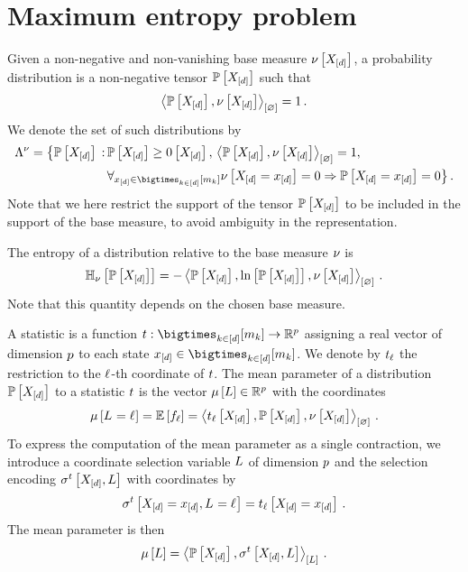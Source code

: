 \section{Maximum entropy problem}

Given a non-negative and non-vanishing base measure $\nu\left[X_{[d]}\right]$, a probability distribution is a non-negative tensor $\mathbb{P}\left[X_{[d]}\right]$ such that
\begin{align*}
    \left\langle \mathbb{P}\left[X_{[d]}\right],\nu\left[X_{[d]}\right]\right\rangle_{\left[ \varnothing \right]} = 1 \, .
\end{align*}
We denote the set of such distributions by
\begin{align*}
    \distmeasuredby{\basemeasure}
    = \big\{ \probwith \wcols &\probwith \geq \zerosat{\shortcatvariables} \ncond \contraction{\probwith,\basemeasurewith} = 1 \ncond \\
    &\forall_{\shortcatindicesin} \basemeasureat{\indexedshortcatvariables}=0 \Rightarrow \probat{\indexedshortcatvariables}=0  \big\} \, .
\end{align*}
Note that we here restrict the support of the tensor $\mathbb{P}\left[X_{[d]}\right]$ to be included in the support of the base measure, to avoid ambiguity in the representation.

The entropy of a distribution relative to the base measure $\nu$ is
\begin{align*}
    \mathbb{H}_{\nu}\left[\mathbb{P}\left[X_{[d]}\right]\right]
    = -\left\langle \mathbb{P}\left[X_{[d]}\right],\ln \left[ \mathbb{P}\left[X_{[d]}\right] \right],\nu\left[X_{[d]}\right]\right\rangle_{\left[ \varnothing \right]} \, .
\end{align*}
Note that this quantity depends on the chosen base measure.

A statistic is a function $\sstat:\facstates\rightarrow\rr^\seldim$ assigning a real vector of dimension $p$ to each state $\shortcatindicesin$.
We denote by $t_{\ell}$ the restriction to the $\ell$-th coordinate of $t$.
The mean parameter of a distribution $\mathbb{P}\left[X_{[d]}\right]$ to a statistic $t$ is the vector $\mu\left[L\right]\in\mathbb{R}^p$ with the coordinates
\begin{align*}
    \mu\left[L_{}=\ell_{}\right]
    = \mathbb{E}\left[f_{\ell}\right]
    = \left\langle t_{\ell}\left[X_{[d]}\right],\mathbb{P}\left[X_{[d]}\right],\nu\left[X_{[d]}\right]\right\rangle_{\left[ \varnothing \right]} \, .
\end{align*}
To express the computation of the mean parameter as a single contraction, we introduce a coordinate selection variable $L$ of dimension $p$ and the selection encoding $\sigma^{t}\left[X_{[d]},L\right]$ with coordinates by
\begin{align*}
    \sigma^{t}\left[X_{[d]}=x_{[d]},L_{}=\ell_{}\right]
    = t_{\ell}\left[X_{[d]}=x_{[d]}\right] \, .
\end{align*}
The mean parameter is then
\begin{align*}
    \mu\left[L\right]
    = \left\langle \mathbb{P}\left[X_{[d]}\right],\sigma^{t}\left[X_{[d]},L\right]\right\rangle_{\left[ L \right]} \, .
\end{align*}

